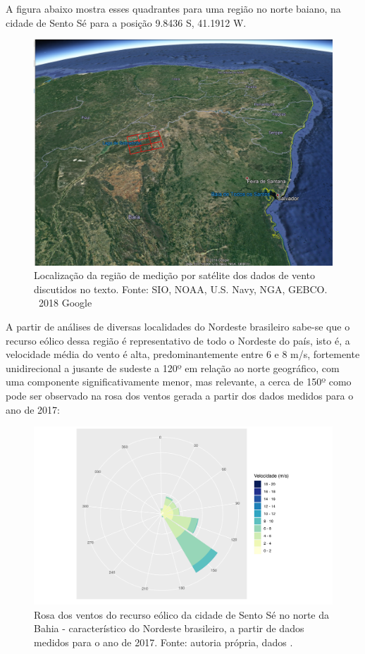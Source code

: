 \documentclass[
	12pt,				%
	openright,			%
	oneside,			%
	a4paper,			%
	english,			%
	french,				%
	spanish,			%
	brazil				%
	]{abntex2}
\begin{document}
A figura abaixo mostra esses quadrantes para uma região no norte baiano, na cidade de Sento Sé para a posição 9.8436 S, 41.1912 W.

\begin{figure}[h]
    \centering
	\includegraphics[scale=0.6]{earth}
	\caption{Localização da região de medição por satélite dos dados de vento discutidos no texto. Fonte: SIO, NOAA, U.S. Navy, NGA, GEBCO. \textcopyright \  2018 Google}
\end{figure}
\FloatBarrier

A partir de análises de diversas localidades do Nordeste brasileiro sabe-se que o recurso eólico dessa região é representativo de todo o Nordeste do país, isto é, a velocidade média do vento é alta, predominantemente entre 6 e 8 m/s, fortemente unidirecional a jusante de sudeste a 120º em relação ao norte geográfico, com uma componente significativamente menor, mas relevante, a cerca de 150º como pode ser observado na rosa dos ventos gerada a partir dos dados medidos para o ano de 2017:

\begin{figure}[h]
    \centering
	\includegraphics[scale=0.9]{windrose}
	\caption{Rosa dos ventos do recurso eólico da cidade de Sento Sé no norte da Bahia - característico do Nordeste brasileiro,  a partir de dados medidos para o ano de 2017. Fonte: autoria própria, dados \cite{era5}.}
\end{figure}
\FloatBarrier
\end{document}
